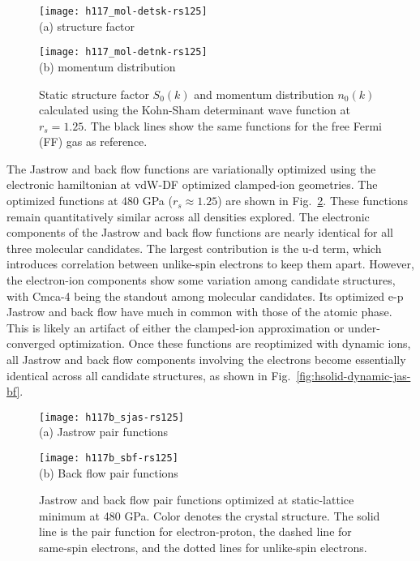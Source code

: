 \begin{figure}[h]
	\centering
	\begin{minipage}{0.49\textwidth}
		\centering
		\texttt{[image: h117\_mol-detsk-rs125]}\\
		(a) structure factor
	\end{minipage}
	\begin{minipage}{0.49\textwidth}
		\centering
		\texttt{[image: h117\_mol-detnk-rs125]}\\
		(b) momentum distribution
	\end{minipage}
	\caption{Static structure factor $S_0(k)$ and momentum distribution $n_0(k)$ calculated using the Kohn-Sham determinant wave function at $r_s=1.25$. The black lines show the same functions for the free Fermi (FF) gas as reference.}
	\label{fig:hsolid-det-sk-nk}
\end{figure}

The Jastrow and back flow functions are variationally optimized using the electronic hamiltonian at vdW-DF optimized clamped-ion geometries. The optimized functions at 480 GPa ($r_s\approx 1.25$) are shown in Fig.~\ref{fig:hsolid-static-jas-bf}.
These functions remain quantitatively similar across all densities explored.
The electronic components of the Jastrow and back flow functions are nearly identical for all three molecular candidates.
The largest contribution is the u-d term, which introduces correlation between unlike-spin electrons to keep them apart.
However, the electron-ion components show some variation among candidate structures, with Cmca-4 being the standout among molecular candidates.
Its optimized e-p Jastrow and back flow have much in common with those of the atomic phase.
This is likely an artifact of either the clamped-ion approximation or under-converged optimization. Once these functions are reoptimized with dynamic ions, all Jastrow and back flow components involving the electrons become essentially identical across all candidate structures, as shown in Fig.~\ref{fig:hsolid-dynamic-jas-bf}.

\begin{figure}[h]
	\centering
	\begin{minipage}{0.49\textwidth}
		\centering
		\texttt{[image: h117b\_sjas-rs125]}\\
		(a) Jastrow pair functions
	\end{minipage}
	\begin{minipage}{0.49\textwidth}
		\centering
		\texttt{[image: h117b\_sbf-rs125]}\\
		(b) Back flow pair functions
	\end{minipage}
	\caption{Jastrow and back flow pair functions optimized at static-lattice minimum at 480 GPa. Color denotes the crystal structure. The solid line is the pair function for electron-proton, the dashed line for same-spin electrons, and the dotted lines for unlike-spin electrons.}
	\label{fig:hsolid-static-jas-bf}
\end{figure}

